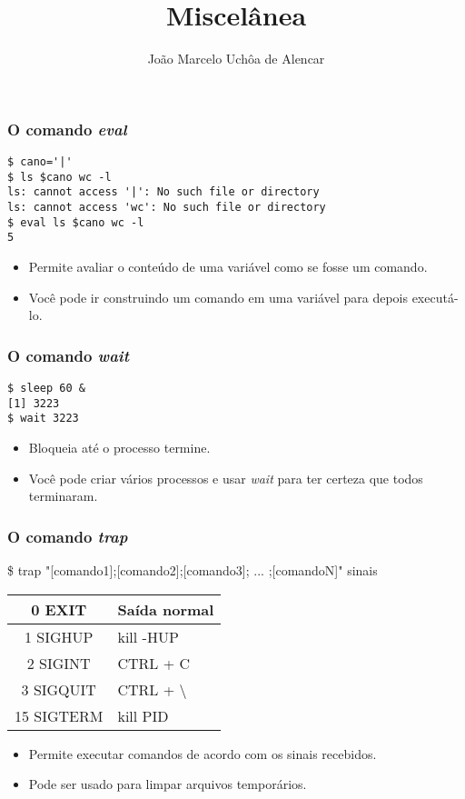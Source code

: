 \documentclass{beamer}
\title{Miscelânea}
\author[João Marcelo Uchôa de Alencar]{João Marcelo Uchôa de Alencar}
\institute{Universidade Federal do Ceará - Quixadá}
\begin{document}
   \begin{frame}
      \titlepage
   \end{frame}

   \begin{frame}[fragile]
      \frametitle{O comando \textit{eval}}
      \begin{verbatim}
$ cano='|'
$ ls $cano wc -l
ls: cannot access '|': No such file or directory
ls: cannot access 'wc': No such file or directory
$ eval ls $cano wc -l
5
      \end{verbatim}

      \begin{itemize}
         \item Permite avaliar o conteúdo de uma variável como se fosse um comando.
         \item Você pode ir construindo um comando em uma variável para depois executá-lo.
      \end{itemize}
   
\end{frame}

   \begin{frame}[fragile]
      \frametitle{O comando \textit{wait}}
      \begin{verbatim}
$ sleep 60 &
[1] 3223
$ wait 3223
      \end{verbatim}
      \begin{itemize}
         \item Bloqueia até o processo termine.
         \item Você pode criar vários processos e usar \textit{wait} para ter certeza que todos terminaram.
      \end{itemize}
\end{frame}

   \begin{frame}
      \frametitle{O comando \textit{trap}}
      \begin{small}
 \$ trap "[comando1];[comando2];[comando3]; ... ;[comandoN]" sinais \\
      \end{small}   
      \begin{table}
         \begin{tabular}{c|l}
         0 EXIT     & Saída normal \\
         \hline 
         1 SIGHUP   & kill -HUP \\
         \hline 
         2 SIGINT   & CTRL + C \\
         \hline 
         3 SIGQUIT  & CTRL + \textbackslash \\
         \hline 
         15 SIGTERM & kill PID \\
         \hline 
         \end{tabular}
      \end{table}
      \begin{itemize}
         \item Permite executar comandos de acordo com os sinais recebidos.
         \item Pode ser usado para limpar arquivos temporários.
      \end{itemize}
   \end{frame}
\end{document}
